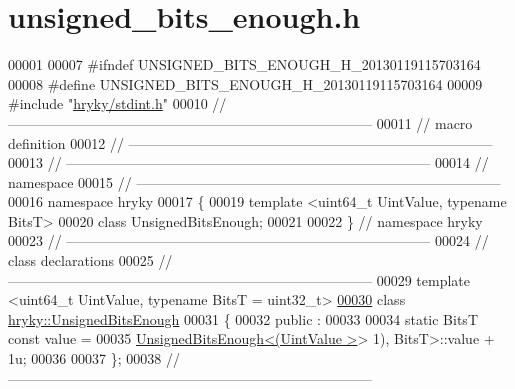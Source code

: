 \hypertarget{unsigned__bits__enough_8h_source}{\section{unsigned\-\_\-bits\-\_\-enough.\-h}
}

\begin{DoxyCode}
00001 
00007 \textcolor{preprocessor}{#ifndef UNSIGNED\_BITS\_ENOUGH\_H\_20130119115703164}
00008 \textcolor{preprocessor}{}\textcolor{preprocessor}{#define UNSIGNED\_BITS\_ENOUGH\_H\_20130119115703164}
00009 \textcolor{preprocessor}{}\textcolor{preprocessor}{#include "\hyperlink{stdint_8h}{hryky/stdint.h}"}
00010 \textcolor{comment}{//
      ------------------------------------------------------------------------------}
00011 \textcolor{comment}{// macro definition}
00012 \textcolor{comment}{//
      ------------------------------------------------------------------------------}
00013 \textcolor{comment}{//
      ------------------------------------------------------------------------------}
00014 \textcolor{comment}{// namespace}
00015 \textcolor{comment}{//
      ------------------------------------------------------------------------------}
00016 \textcolor{keyword}{namespace }hryky
00017 \{
00019     \textcolor{keyword}{template} <u\textcolor{keywordtype}{int}64\_t U\textcolor{keywordtype}{int}Value, \textcolor{keyword}{typename} BitsT>
00020     \textcolor{keyword}{class }UnsignedBitsEnough;
00021 
00022 \} \textcolor{comment}{// namespace hryky}
00023 \textcolor{comment}{//
      ------------------------------------------------------------------------------}
00024 \textcolor{comment}{// class declarations}
00025 \textcolor{comment}{//
      ------------------------------------------------------------------------------}
00029 \textcolor{comment}{}\textcolor{keyword}{template} <u\textcolor{keywordtype}{int}64\_t U\textcolor{keywordtype}{int}Value, \textcolor{keyword}{typename} BitsT = u\textcolor{keywordtype}{int}32\_t>
\hypertarget{unsigned__bits__enough_8h_source_l00030}{}\hyperlink{classhryky_1_1_unsigned_bits_enough}{00030} \textcolor{keyword}{class }\hyperlink{classhryky_1_1_unsigned_bits_enough}{hryky::UnsignedBitsEnough}
00031 \{
00032 \textcolor{keyword}{public} :
00033 
00034     \textcolor{keyword}{static} BitsT \textcolor{keyword}{const} value =
00035         \hyperlink{classhryky_1_1_unsigned_bits_enough}{UnsignedBitsEnough<(UintValue >}> 1), BitsT>::value + 1u;
00036 
00037 \};
00038 \textcolor{comment}{//
      ------------------------------------------------------------------------------}

\end{DoxyCode}
